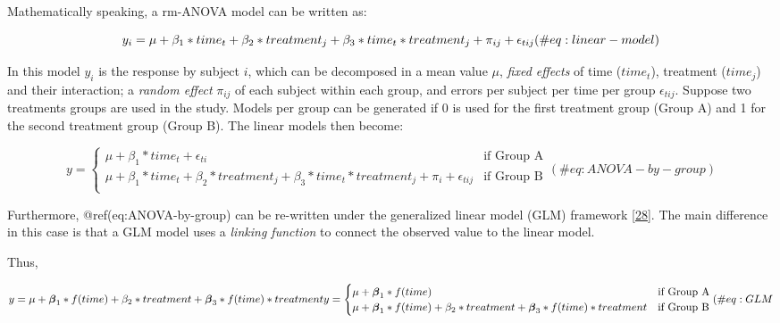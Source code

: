 \documentclass[
]{article}
\begin{document}
Mathematically speaking, a rm-ANOVA model can be written as:

\begin{equation}
  y_{i} = \mu+ \beta_1* time_{t} + \beta_2* treatment_{j} + \beta_3* time_{t} * treatment_{j}+\pi_{ij} +\epsilon_{tij}\\ (\#eq:linear-model)
\end{equation}

In this model \(y_i\) is the response by subject \(i\), which can be
decomposed in a mean value \(\mu\), \emph{fixed effects} of time
(\(time_t\)), treatment (\(time_j\)) and their interaction; a
\emph{random effect} \(\pi_{ij}\) of each subject within each group, and
errors per subject per time per group \(\epsilon_{tij}\). Suppose two
treatments groups are used in the study. Models per group can be
generated if 0 is used for the first treatment group (Group A) and 1 for
the second treatment group (Group B). The linear models then become:

\begin{equation}
  y = \begin{cases}
  \mu + \beta_1*time_{t}+\epsilon_{ti}   & \mbox{if Group A}\\
  \mu + \beta_1 * time_{t} + \beta_2 * treatment_{j} +\beta_3* time_{t} * treatment_{j}        +\pi_{i}+ \epsilon_{tij}  & \mbox{if Group B}\\
  \end{cases}
  (\#eq:ANOVA-by-group)
\end{equation}

Furthermore, @ref(eq:ANOVA-by-group) can be re-written under the
generalized linear model (GLM) framework
{[}\protect\hyperlink{ref-nelder1972}{28}{]}. The main difference in
this case is that a GLM model uses a \emph{linking function} to connect
the observed value to the linear model.

Thus,

\begin{equation}
  y =\mu +\boldsymbol{\beta}_1* f(time) + \beta_2* treatment+\boldsymbol{\beta}_3* f(time)*treatment \\

  y = \begin{cases}
  \mu +\boldsymbol{\beta}_1* f(time)  & \mbox{if Group A} \\
  \mu +\boldsymbol{\beta}_1* f(time)  + \beta_2* treatment + \boldsymbol{\beta}_3* f(time) *     treatment   & \mbox{if Group B}\\
  \end{cases}
  \\
  (\#eq:GLM
\end{equation}
\end{document}
